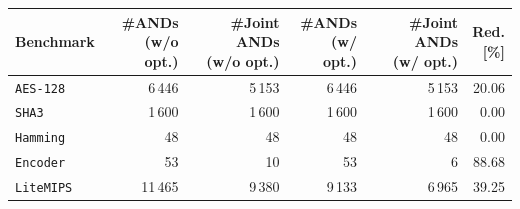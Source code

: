 \begin{tabular}{lrrrrr}
    \toprule[1.2pt]
    Benchmark &
    \makecell{\#ANDs\\(w/o opt.)} &
    \makecell{\#Joint ANDs\\(w/o opt.)} &
    \makecell{\#ANDs\\(w/ opt.)} &
    \makecell{\#Joint ANDs\\(w/ opt.)} &
    \makecell{Red.\\{} [\%]} \\
    \midrule
    \texttt{AES-128}  &  6\,446  &  5\,153 &  6\,446  &  5\,153 & 20.06  \\
    \texttt{SHA3}     &  1\,600  &  1\,600 &  1\,600  &  1\,600 &  0.00  \\
    \texttt{Hamming}  &      48  &      48 &      48  &      48 &  0.00  \\
    \texttt{Encoder}  &      53  &      10 &      53  &       6 & 88.68  \\
    \texttt{LiteMIPS} & 11\,465  &  9\,380 &  9\,133  &  6\,965 & 39.25  \\
    \bottomrule[1.2pt]
\end{tabular}
